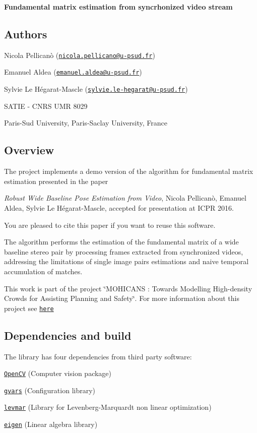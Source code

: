 {\bfseries Fundamental matrix estimation from syncrhonized video stream}

\subsection*{Authors}

Nicola Pellicanò (\href{mailto:nicola.pellicano@u-psud.fr}{\tt nicola.\+pellicano@u-\/psud.\+fr})

Emanuel Aldea (\href{mailto:emanuel.aldea@u-psud.fr}{\tt emanuel.\+aldea@u-\/psud.\+fr})

Sylvie Le Hégarat-\/\+Mascle (\href{mailto:sylvie.le-hegarat@u-psud.fr}{\tt sylvie.\+le-\/hegarat@u-\/psud.\+fr})

S\+A\+T\+I\+E -\/ C\+N\+R\+S U\+M\+R 8029

Paris-\/\+Sud University, Paris-\/\+Saclay University, France

\subsection*{Overview}

The project implements a demo version of the algorithm for fundamental matrix estimation presented in the paper

{\itshape Robust Wide Baseline Pose Estimation from Video}, Nicola Pellicanò, Emanuel Aldea, Sylvie Le Hégarat-\/\+Mascle, accepted for presentation at I\+C\+P\+R 2016.

You are pleased to cite this paper if you want to reuse this software.

The algorithm performs the estimation of the fundamental matrix of a wide baseline stereo pair by processing frames extracted from synchronized videos, addressing the limitations of single image pairs estimations and naive temporal accumulation of matches.

This work is part of the project \char`\"{}\+M\+O\+H\+I\+C\+A\+N\+S \+: Towards Modelling High-\/density Crowds for Assisting Planning and Safety\char`\"{}. For more information about this project see \href{http://hebergement.u-psud.fr/emi/MOHICANS/index.html}{\tt here}

\subsection*{Dependencies and build}

The library has four dependencies from third party software\+:
\begin{DoxyItemize}
\item \href{http://opencv.org}{\tt Open\+C\+V} (Computer vision package)
\item \href{https://github.com/edrosten/gvars}{\tt gvars} (Configuration library)
\item \href{http://users.ics.forth.gr/~lourakis/levmar/}{\tt levmar} (Library for Levenberg-\/\+Marquardt non linear optimization)
\item \href{http://eigen.tuxfamily.org/index.php?title=Main_Page}{\tt eigen} (Linear algebra library)
\end{DoxyItemize}

